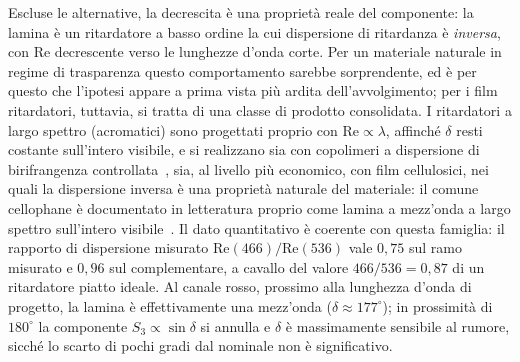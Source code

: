 Escluse le alternative, la decrescita è una proprietà reale del componente: la lamina è un ritardatore a basso ordine la cui dispersione di ritardanza è \emph{inversa}, con $\mathrm{Re}$ decrescente verso le lunghezze d'onda corte. Per un materiale naturale in regime di trasparenza questo comportamento sarebbe sorprendente, ed è per questo che l'ipotesi appare a prima vista più ardita dell'avvolgimento; per i film ritardatori, tuttavia, si tratta di una classe di prodotto consolidata. I ritardatori a largo spettro (acromatici) sono progettati proprio con $\mathrm{Re} \propto \lambda$, affinché $\delta$ resti costante sull'intero visibile, e si realizzano sia con copolimeri a dispersione di birifrangenza controllata~\cite{Uchiyama2012Copolycarbonate}, sia, al livello più economico, con film cellulosici, nei quali la dispersione inversa è una proprietà naturale del materiale: il comune cellophane è documentato in letteratura proprio come lamina a mezz'onda a largo spettro sull'intero visibile~\cite{OrtizGutierrez2001Cellophane}. Il dato quantitativo è coerente con questa famiglia: il rapporto di dispersione misurato $\mathrm{Re}(466)/\mathrm{Re}(536)$ vale $0{,}75$ sul ramo misurato e $0{,}96$ sul complementare, a cavallo del valore $466/536 = 0{,}87$ di un ritardatore piatto ideale. Al canale rosso, prossimo alla lunghezza d'onda di progetto, la lamina è effettivamente una mezz'onda ($\delta \approx 177^\circ$); in prossimità di $180^\circ$ la componente $S_3 \propto \sin\delta$ si annulla e $\delta$ è massimamente sensibile al rumore, sicché lo scarto di pochi gradi dal nominale non è significativo.


